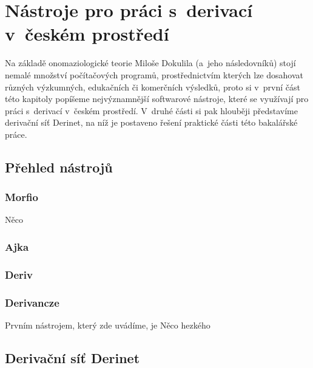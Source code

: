 \hypertarget{nuxe1stroje-pro-pruxe1ci-s-derivacuxed-v-ux10deskuxe9m-prostux159eduxed}{%
\chapter{Nástroje pro práci s~derivací v~českém
prostředí}\label{nuxe1stroje-pro-pruxe1ci-s-derivacuxed-v-ux10deskuxe9m-prostux159eduxed}}

Na základě onomaziologické teorie Miloše Dokulila (a~jeho následovníků)
stojí nemalé množství počítačových programů, prostřednictvím kterých lze
dosahovat různých výzkumných, edukačních či komerčních výsledků, proto
si v~první část této kapitoly popíšeme nejvýznamnější softwarové
nástroje, které se využívají pro práci s~derivací v~českém prostředí.
V~druhé části si pak hlouběji představíme derivační síť Derinet, na níž je
postaveno řešení praktické části této bakalářské práce.

\hypertarget{pux159ehled-nuxe1strojux16f}{%
\section{Přehled nástrojů}\label{pux159ehled-nuxe1strojux16f}}

\hypertarget{morfio}{%
\subsection{Morfio}\label{morfio}}

Něco~\parencite{cvrcek13}

\hypertarget{ajka}{%
\subsection{Ajka}\label{ajka}}

\hypertarget{deriv}{%
\subsection{Deriv}\label{deriv}}

\hypertarget{derivancze}{%
\subsection{Derivancze}\label{derivancze}}

Prvním nástrojem, který zde uvádíme, je Něco hezkého
\parencite[516]{pala15}

\hypertarget{derivaux10dnuxed-suxedux165-derinet}{%
\section{Derivační síť
Derinet}\label{derivaux10dnuxed-suxedux165-derinet}}
